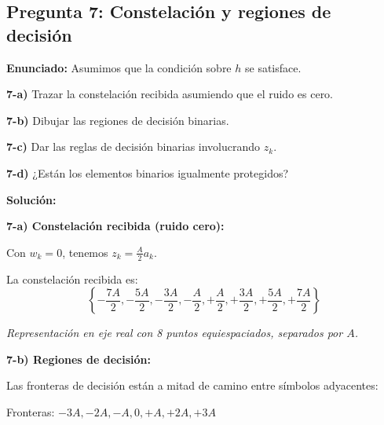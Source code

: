 \documentclass[11pt,a4paper]{article}
\begin{document}
\subsection*{Pregunta 7: Constelaci\'on y regiones de decisi\'on}

\textbf{Enunciado:} Asumimos que la condici\'on sobre $h$ se satisface.

\textbf{7-a)} Trazar la constelaci\'on recibida asumiendo que el ruido es cero.

\textbf{7-b)} Dibujar las regiones de decisi\'on binarias.

\textbf{7-c)} Dar las reglas de decisi\'on binarias involucrando $z_k$.

\textbf{7-d)} ¿Est\'an los elementos binarios igualmente protegidos?

\vspace{0.3cm}
\textbf{Soluci\'on:}

\textbf{7-a) Constelaci\'on recibida (ruido cero):}

Con $w_k = 0$, tenemos $z_k = \frac{A}{2}a_k$.

La constelaci\'on recibida es:
\[
\left\{-\frac{7A}{2}, -\frac{5A}{2}, -\frac{3A}{2}, -\frac{A}{2}, +\frac{A}{2}, +\frac{3A}{2}, +\frac{5A}{2}, +\frac{7A}{2}\right\}
\]

\textit{Representaci\'on en eje real con 8 puntos equiespaciados, separados por $A$.}

\textbf{7-b) Regiones de decisi\'on:}

Las fronteras de decisi\'on est\'an a mitad de camino entre s\'imbolos adyacentes:

Fronteras: $-3A, -2A, -A, 0, +A, +2A, +3A$

\begin{center}
\end{center}
\end{document}
